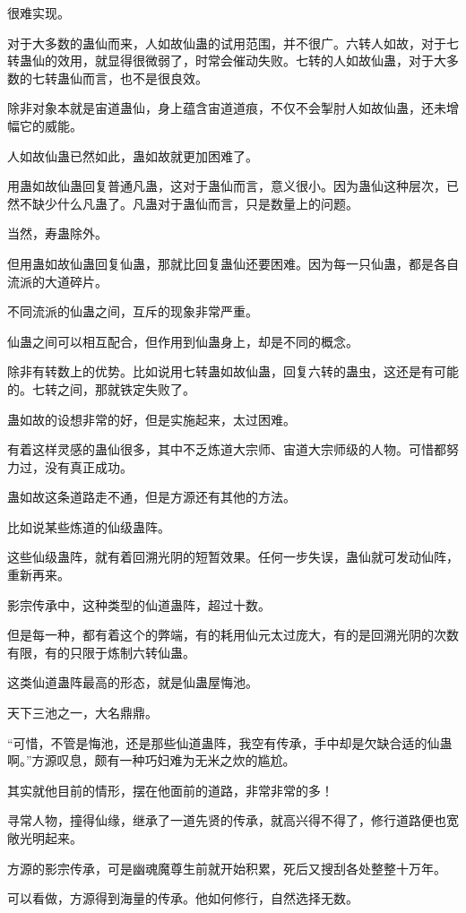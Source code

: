 \begin{this_body}
很难实现。

对于大多数的蛊仙而来，人如故仙蛊的试用范围，并不很广。六转人如故，对于七转蛊仙的效用，就显得很微弱了，时常会催动失败。七转的人如故仙蛊，对于大多数的七转蛊仙而言，也不是很良效。

除非对象本就是宙道蛊仙，身上蕴含宙道道痕，不仅不会掣肘人如故仙蛊，还未增幅它的威能。

人如故仙蛊已然如此，蛊如故就更加困难了。

用蛊如故仙蛊回复普通凡蛊，这对于蛊仙而言，意义很小。因为蛊仙这种层次，已然不缺少什么凡蛊了。凡蛊对于蛊仙而言，只是数量上的问题。

当然，寿蛊除外。

但用蛊如故仙蛊回复仙蛊，那就比回复蛊仙还要困难。因为每一只仙蛊，都是各自流派的大道碎片。

不同流派的仙蛊之间，互斥的现象非常严重。

仙蛊之间可以相互配合，但作用到仙蛊身上，却是不同的概念。

除非有转数上的优势。比如说用七转蛊如故仙蛊，回复六转的蛊虫，这还是有可能的。七转之间，那就铁定失败了。

蛊如故的设想非常的好，但是实施起来，太过困难。

有着这样灵感的蛊仙很多，其中不乏炼道大宗师、宙道大宗师级的人物。可惜都努力过，没有真正成功。

蛊如故这条道路走不通，但是方源还有其他的方法。

比如说某些炼道的仙级蛊阵。

这些仙级蛊阵，就有着回溯光阴的短暂效果。任何一步失误，蛊仙就可发动仙阵，重新再来。

影宗传承中，这种类型的仙道蛊阵，超过十数。

但是每一种，都有着这个的弊端，有的耗用仙元太过庞大，有的是回溯光阴的次数有限，有的只限于炼制六转仙蛊。

这类仙道蛊阵最高的形态，就是仙蛊屋悔池。

天下三池之一，大名鼎鼎。

“可惜，不管是悔池，还是那些仙道蛊阵，我空有传承，手中却是欠缺合适的仙蛊啊。”方源叹息，颇有一种巧妇难为无米之炊的尴尬。

其实就他目前的情形，摆在他面前的道路，非常非常的多！

寻常人物，撞得仙缘，继承了一道先贤的传承，就高兴得不得了，修行道路便也宽敞光明起来。

方源的影宗传承，可是幽魂魔尊生前就开始积累，死后又搜刮各处整整十万年。

可以看做，方源得到海量的传承。他如何修行，自然选择无数。


\end{this_body}
